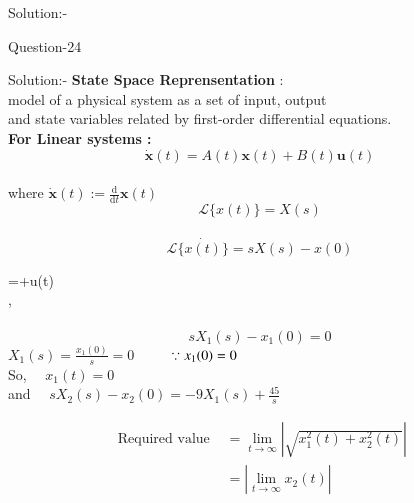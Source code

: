 \documentclass[journal,12pt,twocolumn]{IEEEtran}
\begin{document}
\begin{frame}{Solution:- }
\begin{frame}{Question-24 }
\end{frame}


\begin{frame}{Solution:- }
\textbf{State Space Reprensentation} : \\ model of a physical
system as a set of input, output\\ and state variables related by first-order differential equations.
\\\textbf{For Linear systems : }
\\$$\dot{\mathbf{x}}(t)=A(t) \mathbf{x}(t)+B(t) \mathbf{u}(t)$$
\\ where $\dot{\mathbf{x}}(t):=\frac{\mathrm{d}}{\mathrm{d} t} \mathbf{x}(t)$
\\$$\mathscr{L}\{x(t)\}=X(s)$$
\\$$\mathscr{L}\{\dot{x(t)}\}=sX(s) - x(0)$$
\end{frame}
 
\begin{frame}{}
=\left[\begin{array}{cc}
{0} & {0} \\
{0} & {-9}
\end{array}\right]\left[\begin{array}{l}
{x_{1}(t)} \\
{x_{2}(t)}
\end{array}\right]+\left[\begin{array}{c}
{0} \\
{45}
\end{array}\right] u(t) \vspace{5mm}\\
,\\
\\  
$$
s X_{1}(s)-x_{1}(0)=0
$$
$X_{1}(s)=\frac{x_{1}(0)}{s}=0 \quad$     $\text \quad \because x_{1}(0)=0$
\\So, $\quad x_{1}(t)=0$\\
and $\quad s X_{2}(s)-x_{2}(0)=-9 X_{1}(s)+\frac{45}{s}$


\end{frame}

\begin{frame}{}
$$
\begin{aligned}
\text { Required value } &=\lim _{t \rightarrow \infty}|\sqrt{x_{1}^{2}(t)+x_{2}^{2}(t)}| \\
&=\left|\lim _{t \rightarrow \infty} x_{2}(t)\right|
\end{aligned}
$$


\end{frame}
\end{frame}
\end{document}
